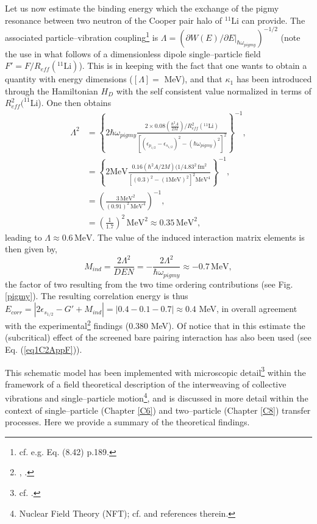  Let us now estimate the binding energy which the exchange of the pigmy resonance between two neutron of the Cooper pair halo of $^{11}$Li can provide.
The associated particle--vibration coupling\footnote{cf. e.g. \cite{Brink:05} Eq. (8.42) p.189.} is $\Lambda= \left(\partial W(E)/\partial E|_{\hbar\omega_{pigmy}}\right)^{-1/2}$ (note the use in what follows of a dimensionless dipole single--particle field $F'=F/R_{eff}(^{11}\text{Li})$). This is in keeping with the fact that one wants to obtain a quantity with energy dimensions ($[\Lambda]=$ MeV), and that $\kappa_1$ has been introduced through the Hamiltonian $H_D$ with the self consistent value normalized in terms of $R^2_{eff}(^{11}$Li). 
 One then obtains
\begin{equation*}
\begin{split}
\Lambda^2&=\left\{2\hbar \omega_{pigmy}\frac{2\times 0.08(\frac{\hbar^2A}{2M})/R^2_{eff}(^{11}\text{Li})}{\left[(\epsilon_{p_{1/2}}-\epsilon_{s_{1/2}})^2-(\hbar\omega_{pigmy})^2\right]^2}\right\}^{-1},\\
&=\left\{2\text{MeV}\frac{0.16(\hbar^2A/2M)(1/4.83^2\,\text{fm}^2}{\left[(0.3)^2-(1\text{MeV})^2\right]^2\text{MeV}^4}\right\}^{-1},\\
&=\left(\frac{3\,\text{MeV}^2}{(0.91)^2\,\text{MeV}^4}\right)^{-1},\\
&=\left(\frac{1}{1.7}\right)^2\,\text{MeV}^2\approx 0.35\,\text{MeV}^2,
\end{split}
\end{equation*}   
 leading to $\Lambda\approx 0.6\,\text{MeV}$. The value of the induced interaction matrix elements is then given by,
 \begin{equation}\label{eq2.F.10}
M_{ind}=\frac{2\Lambda^2}{DEN}=-\frac{2\Lambda^2}{\hbar\omega_{pigmy}}\approx-0.7\,\text{MeV},
 \end{equation}
 the factor of two resulting from the two time ordering contributions (see Fig. \ref{pigmy}). The resulting correlation energy is thus $E_{corr}=|2\epsilon_{s_{1/2}}-G'+M_{ind}|=|0.4-0.1-0.7|\approx 0.4$ MeV, in overall agreement with the experimental\footnote{\cite{Bachelet:08}, \cite{Smith:08}.} findings (0.380 MeV). Of notice that in this estimate the (subcritical) effect of the screened bare pairing interaction has also been used (see Eq. (\ref{eq1C2AppF})).
 
 
 
 This schematic model has been implemented with microscopic detail\footnote{cf. \cite{Barranco:01}.} within the framework of a field theoretical description of the interweaving of collective vibrations and single--particle motion\footnote{Nuclear Field Theory (NFT); cf. \cite{Bortignon:77} and references therein.}, and is discussed in more detail within the context of single--particle (Chapter \ref{C6}) and two--particle (Chapter \ref{C8}) transfer processes. Here we provide a summary of the theoretical findings. 
 
